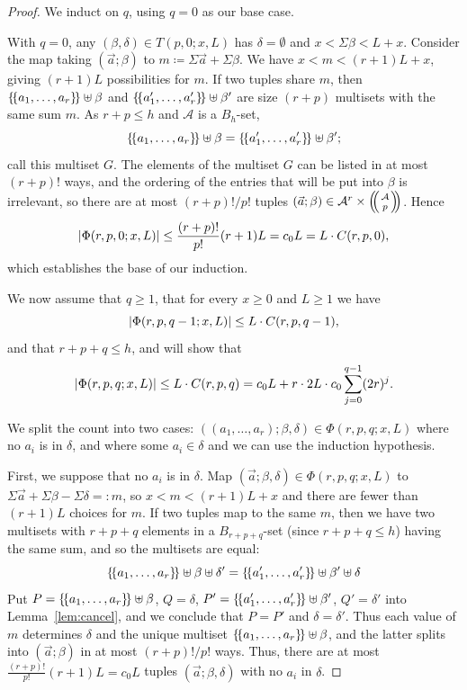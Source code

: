 \documentclass[10pt,letterpaper]{article}
\newcommand{\cA}{\mathcal{A}}
\DeclarePairedDelimiter{\abs}{\lvert}{\rvert}
\DeclarePairedDelimiter{\multi}{\{\!\{}{\}\!\}}
\newcommand{\multibinom}[2]{\left(\kern-0.3em\left(\genfrac{}{}{0pt}{}{#1}{#2}\right)\kern-0.3em\right)}
\theoremstyle{remark}
\begin{document}
\begin{proof}
We induct on $q$, using $q=0$ as our base case.

With $q=0$, any $(\beta,\delta)\in T(p,0;x,L)$ has $\delta=\emptyset$ and $x<\Sigma\beta<L+x$. Consider the map taking 
$(\vec a;\beta)$ to $m\coloneqq \Sigma \vec a + \Sigma\beta$.  We have $x < m < (r+1)L+x$, giving $(r+1)L$ possibilities for $m$.  If two tuples share
$m$, then $\multi{a_1,\dots,a_r } \uplus \beta$ and $\multi{a_1',\dots,a_r'}\uplus\beta'$ are size $(r+p)$ multisets with the same sum $m$. As $r+p\le h$ and $\cA$ is a $B_h$-set,
  \[\multi{a_1,\dots,a_r}\uplus\beta = \multi{a_1',\dots,a_r'}\uplus\beta';\]
call this multiset $G$. 
The elements of the multiset $G$ can be listed in at most $(r+p)!$ ways, and the ordering of the entries that will be put into $\beta$ is irrelevant, so there are at most $(r+p)!/p!$ tuples $(\vec a;\beta) \in \cA^r \times \multibinom{\cA}{p}$.  Hence 
  \[\abs*{\Phi(r ,p,0;x,L)} \le \frac{(r +p)!}{p!} (r+1)L=c_0L = L \cdot C(r,p,0),\]
which establishes the base of our induction.

We now assume that $q\ge 1$, that for every $x\ge 0$ and $L\ge 1$ we have
  \[\abs{\Phi(r,p,q-1;x,L)} \le L\cdot C(r,p,q-1),\] 
and that $r+p+q \le h$, and will show that 
  \[\abs*{\Phi(r,p,q;x,L)} \le L\cdot C(r,p,q) = c_0L + r \cdot 2L\cdot c_0 \sum_{j=0}^{q-1}(2r )^j.\]

We split the count into two cases: $((a_1,\dots,a_r );\beta,\delta)\in \Phi(r,p,q;x,L)$ where no $a_i$ is in $\delta$, and where some $a_i \in\delta$ and we can use the induction hypothesis.

First, we suppose that no $a_i$ is in $\delta$. Map
$(\vec a;\beta,\delta)\in \Phi(r,p,q;x,L)$ to $\Sigma\vec a+\Sigma\beta - \Sigma\delta =: m$,
so $x< m<(r+1)L+x$ and there are fewer than $(r+1)L$ choices for $m$.  If two tuples map to the same $m$, then we have two multisets with $r+p+q$ elements in a $B_{r+p+q}$-set (since $r+p+q \le h$) having the same sum, and so the multisets are equal:
  \[\multi{a_1,\dots,a_r } \uplus \beta \uplus \delta'=\multi{a_1',\dots,a_r '} \uplus \beta'\uplus\delta\] 
Put $P=\multi{a_1,\dots,a_r } \uplus \beta$, $Q=\delta$, $P'=\multi{a_1',\dots,a_r '}\uplus\beta'$, $Q'=\delta'$ into Lemma~\ref{lem:cancel}, and we conclude that $P=P'$ and $\delta=\delta'$. Thus each value of $m$ determines $\delta$ and the unique multiset $\multi{a_1,\dots,a_r } \uplus \beta$, and the latter splits into $(\vec a;\beta)$ in at most $(r +p)!/p!$ ways. Thus, there are at most $\frac{(r +p)!}{p!}(r +1)L=c_0L$ tuples $(\vec a;\beta,\delta)$ with no $a_i$ in $\delta$.


\end{proof}
\end{document}
